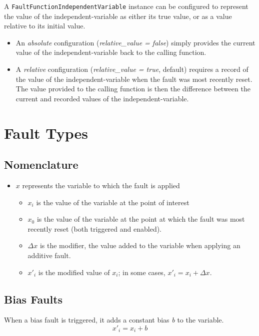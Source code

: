 \documentclass[11pt,fleqn]{report}
\begin{document}
A \verb"FaultFunctionIndependentVariable" instance can be configured to
represent the value
of the independent-variable as either its true value, or as a value relative to
its initial value.
\begin{itemize}
  \item An \textit{absolute} configuration (\textit{relative\_value = false})
    simply provides the current value of the independent-variable back to the
    calling function.
  \item A \textit{relative} configuration (\textit{relative\_value = true},
    default) requires a record of the value of the independent-variable when
    the fault was most recently reset. The value provided to the calling
    function is then the difference between the current and recorded values
    of the independent-variable.
\end{itemize}




\section {Fault Types} \label{sec:formulation:fault:fault_type}
\subsection {Nomenclature}
\begin{itemize}
  \item $x$ represents the variable to which the fault is applied
  \begin{itemize}
    \item $x_i$ is the value of the variable at the point of interest
    \item $x_0$ is the value of the variable at the point at which the fault was
      most recently reset (both triggered and enabled).
    \item $\Delta x$ is the modifier, the value added to the variable when
      applying an additive fault.
    \item $x'_i$ is the modified value of $x_i$; in some cases, $x'_i = x_i +
      \Delta x$.
  \end{itemize}
\end{itemize}

\subsection{Bias Faults}
\par When a bias fault is triggered, it adds a constant bias \textit{b} to the
variable.
\begin{equation}
x'_i = x_i + b
\end{equation}
\end{document}

